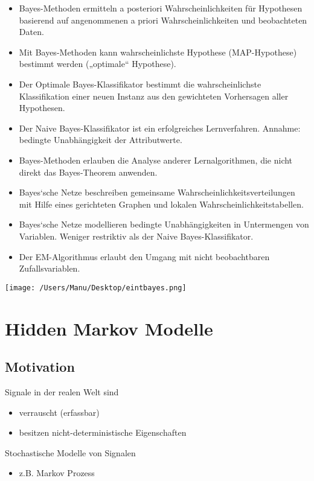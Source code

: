 \documentclass[paper=a4, fontsize=11pt]{scrartcl} %
\numberwithin{equation}{section} %
\numberwithin{figure}{section} %
\numberwithin{table}{section} %
\begin{document}
\begin{itemize}
\item Bayes-Methoden ermitteln a posteriori Wahrscheinlichkeiten für Hypothesen basierend auf angenommenen a priori Wahrscheinlichkeiten und beobachteten Daten.
\item Mit Bayes-Methoden kann wahrscheinlichste Hypothese (MAP-Hypothese) bestimmt werden („optimale“ Hypothese).
\item Der Optimale Bayes-Klassifikator bestimmt die wahrscheinlichste Klassifikation einer neuen Instanz aus den gewichteten Vorhersagen aller Hypothesen.
\item Der Naive Bayes-Klassifikator ist ein erfolgreiches Lernverfahren. Annahme: bedingte Unabhängigkeit der Attributwerte.
\item Bayes-Methoden erlauben die Analyse anderer Lernalgorithmen, die nicht direkt das Bayes-Theorem anwenden.
\item Bayes‘sche Netze beschreiben gemeinsame Wahrscheinlichkeitsverteilungen mit Hilfe eines gerichteten Graphen und lokalen Wahrscheinlichkeitstabellen.
\item Bayes‘sche Netze modellieren bedingte Unabhängigkeiten in Untermengen von Variablen. Weniger restriktiv als der Naive Bayes-Klassifikator.
\item Der EM-Algorithmus erlaubt den Umgang mit nicht beobachtbaren Zufallsvariablen.
\end{itemize}

\texttt{[image: /Users/Manu/Desktop/eintbayes.png]}

\section{Hidden Markov Modelle}

\subsection{Motivation}

Signale in der realen Welt sind
\begin{itemize}
\item verrauscht (erfassbar)
\item besitzen nicht-deterministische Eigenschaften
\end{itemize}

Stochastische Modelle von Signalen
\begin{itemize}
\item z.B. Markov Prozess
\end{itemize}
\end{document}
